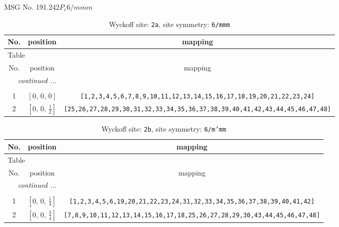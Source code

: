 \documentclass[fleqn,8pt]{jsarticle}
\begin{document}
\setcounter{MaxMatrixCols}{32}

\renewcommand{\tablename}{Table~}
\renewcommand{\figurename}{Figure~}
\begin{center}
\LARGE
MSG No. 191.242\quad$P_{c}6/mmm$
\end{center}
\renewcommand{\arraystretch}{1.2}
\begin{longtable}{ccc}
\caption{Wyckoff site: {\tt 2a}, site symmetry: {\tt 6/mmm}}
 \\
 \hline \hline
No. & position & mapping \\ \hline \endfirsthead

\multicolumn{2}{l}{\tablename\ \thetable{}} \\
 \hline \hline
No. & position & mapping \\ \hline \endhead

 \hline \hline
\multicolumn{2}{r}{\footnotesize\it continued ...} \\ \endfoot

 \hline \hline
\multicolumn{2}{r}{} \\ \endlastfoot

1 & $\left[ 0,\, 0,\, 0 \right]$ & {\tt [1,2,3,4,5,6,7,8,9,10,11,12,13,14,15,16,17,18,19,20,21,22,23,24]} \\ \hline
2 & $\left[ 0,\, 0,\, \frac{1}{2} \right]$ & {\tt [25,26,27,28,29,30,31,32,33,34,35,36,37,38,39,40,41,42,43,44,45,46,47,48]} \\
\end{longtable}
\renewcommand{\arraystretch}{1.2}
\begin{longtable}{ccc}
\caption{Wyckoff site: {\tt 2b}, site symmetry: {\tt 6/m'mm}}
 \\
 \hline \hline
No. & position & mapping \\ \hline \endfirsthead

\multicolumn{2}{l}{\tablename\ \thetable{}} \\
 \hline \hline
No. & position & mapping \\ \hline \endhead

 \hline \hline
\multicolumn{2}{r}{\footnotesize\it continued ...} \\ \endfoot

 \hline \hline
\multicolumn{2}{r}{} \\ \endlastfoot

1 & $\left[ 0,\, 0,\, \frac{1}{4} \right]$ & {\tt [1,2,3,4,5,6,19,20,21,22,23,24,31,32,33,34,35,36,37,38,39,40,41,42]} \\ \hline
2 & $\left[ 0,\, 0,\, \frac{3}{4} \right]$ & {\tt [7,8,9,10,11,12,13,14,15,16,17,18,25,26,27,28,29,30,43,44,45,46,47,48]} \\
\end{longtable}
\end{document}
